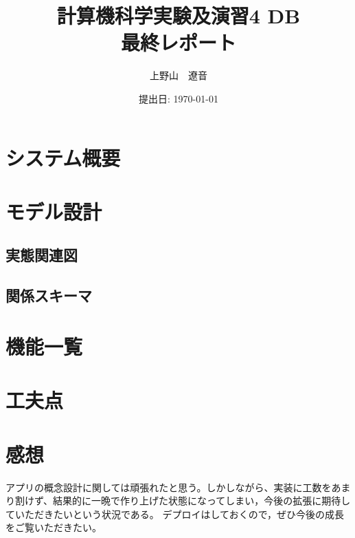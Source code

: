 \documentclass[a4j]{jarticle}
\begin{document}
\title{計算機科学実験及演習4 DB \\ \bf 最終レポート}
\author{上野山　遼音}
\date{提出日: \today} %
\maketitle
\section{システム概要}
\section{モデル設計}
\subsection{実態関連図}
\subsection{関係スキーマ}
\section{機能一覧}
\section{工夫点}

\section{感想}
アプリの概念設計に関しては頑張れたと思う。しかしながら、実装に工数をあまり割けず、結果的に一晩で作り上げた状態になってしまい，今後の拡張に期待していただきたいという状況である。
デプロイはしておくので，ぜひ今後の成長をご覧いただきたい。
\end{document}
